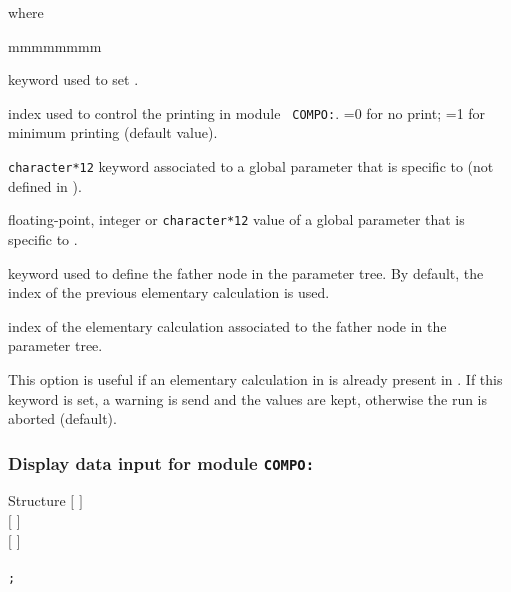 \noindent where
\begin{ListeDeDescription}{mmmmmmmm}

\item[\moc{EDIT}] keyword used to set .

\item[\dusa{iprint}] index used to control the printing in module {\tt
COMPO:}. =0 for no print; =1 for minimum printing (default value).

\item[\dusa{PARKEY}] {\tt character*12} keyword associated to a
global parameter that is specific to  (not defined in ).

\item[\dusa{value}] floating-point, integer or {\tt character*12} value of a
global parameter that is specific to .

\item[\moc{ORIG}] keyword used to define the father node in the parameter tree. By
default, the index of the previous elementary calculation is used.

\item[\dusa{orig}] index of the elementary calculation associated to the father node in the
parameter tree.

\item[\moc{WARNING-ONLY}] This option is useful if an elementary calculation in  
is already present in . If this keyword is set, a warning is send and the  values
are kept, otherwise the run is aborted (default).

\end{ListeDeDescription}

\subsubsection{Display data input for module {\tt COMPO:}}\label{sect:desccpo4}

\vskip -0.5cm

\begin{DataStructure}{Structure }
$[$   $]$ \\
$[$    $]$ \\
$[$   $]$ \\
  \\
{\tt ;}
\end{DataStructure}

